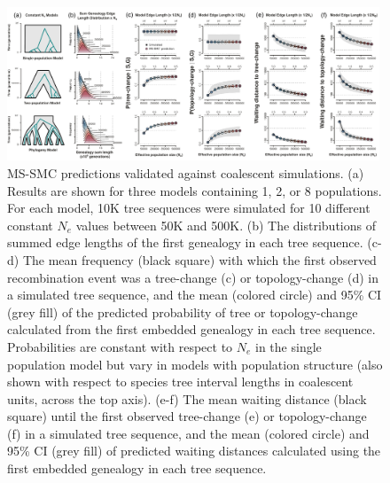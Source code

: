 \documentclass[11pt]{article}
\begin{document}
\begin{figure}[t]
	\centering
	\includegraphics[width=0.99\textwidth]{figures/Fig4-final-validation4.pdf}
	\caption{
		MS-SMC predictions validated against coalescent simulations.
		(a) Results are shown for three models containing 1, 2, or 8 
		populations. %
		For each model, 10K tree sequences were simulated for 10 different
		constant $N_e$ values between 50K and 500K. 
		(b) The distributions of summed edge lengths of the first genealogy in 
		each tree sequence. 
		(c-d) The mean frequency (black square) with which the first observed 
		recombination event was a tree-change (c) or topology-change (d) in a 
		simulated tree sequence, and the mean (colored circle) and 95\% CI 
		(grey fill) of the predicted probability of tree or topology-change 
		calculated from the first embedded genealogy in each tree sequence. 
		Probabilities are constant with respect to $N_e$ in the single population
		model but vary in models with population structure
		(also shown with respect to species tree interval lengths in 
		coalescent units, across the top axis).
		(e-f) The mean waiting distance (black square) until the first observed 
		tree-change (e) or topology-change (f) in a simulated tree sequence, and the mean 
		(colored circle) and 95\% CI (grey fill) of predicted waiting distances calculated
		using the first embedded genealogy in each tree sequence.
	}
	\label{fig:fig-validation}
\end{figure}
\end{document}
